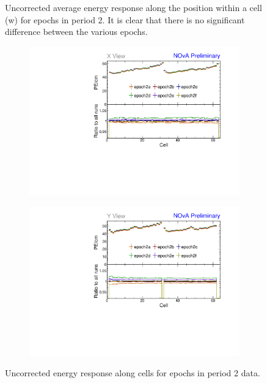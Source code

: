 \begin{figure}[h]
\begin{subfigure}[b]{0.495\textwidth}
\end{subfigure}
\caption[Uncorrected energy response along the position within a cell for period 2 data]{Uncorrected average energy response along the position within a cell (w) for epochs in period 2. It is clear that there is no significant difference between the various epochs.}
\label{fig:CalibhistWPE_period2}
\end{figure}

\begin{figure}[h]
\centering
\begin{subfigure}[b]{0.495\textwidth}
\centering
\includegraphics[width=\textwidth]{Plots/TBCalibration/Attenprofs_P2Data_CellPE_X_Combined.pdf}
\end{subfigure}
\begin{subfigure}[b]{0.495\textwidth}
\centering
\includegraphics[width=\textwidth]{Plots/TBCalibration/Attenprofs_P2Data_CellPE_Y_Combined.pdf}
\end{subfigure}
\caption{Uncorrected energy response along cells for epochs in period 2 data.}
\label{fig:CalibhistCellPE_period2}
\end{figure}

